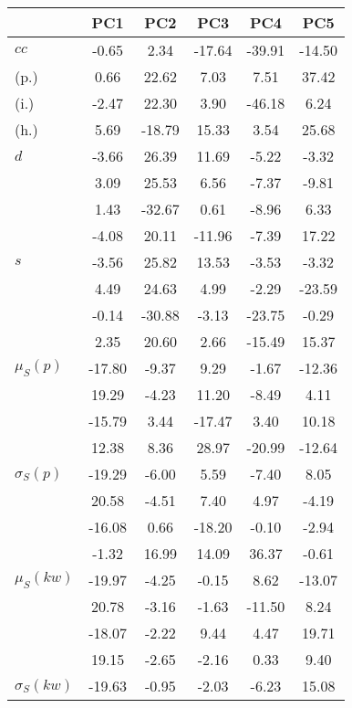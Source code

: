 \begin{table}[h!]
\begin{center}
\begin{tabular}{| l | c | c | c | c | c |}\hline
 & PC1 & PC2 & PC3 & PC4 & PC5 \\\hline
$cc$ & -0.65  & 2.34  & -17.64  & -39.91  & -14.50 \\\hline
(p.) & 0.66  & 22.62  & 7.03  & 7.51  & 37.42 \\\hline
(i.) & -2.47  & 22.30  & 3.90  & -46.18  & 6.24 \\\hline
(h.) & 5.69  & -18.79  & 15.33  & 3.54  & 25.68 \\\hline
$d$ & -3.66  & 26.39  & 11.69  & -5.22  & -3.32 \\\hline
 & 3.09  & 25.53  & 6.56  & -7.37  & -9.81 \\\hline
 & 1.43  & -32.67  & 0.61  & -8.96  & 6.33 \\\hline
 & -4.08  & 20.11  & -11.96  & -7.39  & 17.22 \\\hline
$s$ & -3.56  & 25.82  & 13.53  & -3.53  & -3.32 \\\hline
 & 4.49  & 24.63  & 4.99  & -2.29  & -23.59 \\\hline
 & -0.14  & -30.88  & -3.13  & -23.75  & -0.29 \\\hline
 & 2.35  & 20.60  & 2.66  & -15.49  & 15.37 \\\hline
$\mu_S(p)$ & -17.80  & -9.37  & 9.29  & -1.67  & -12.36 \\\hline
 & 19.29  & -4.23  & 11.20  & -8.49  & 4.11 \\\hline
 & -15.79  & 3.44  & -17.47  & 3.40  & 10.18 \\\hline
 & 12.38  & 8.36  & 28.97  & -20.99  & -12.64 \\\hline
$\sigma_S(p)$ & -19.29  & -6.00  & 5.59  & -7.40  & 8.05 \\\hline
 & 20.58  & -4.51  & 7.40  & 4.97  & -4.19 \\\hline
 & -16.08  & 0.66  & -18.20  & -0.10  & -2.94 \\\hline
 & -1.32  & 16.99  & 14.09  & 36.37  & -0.61 \\\hline
$\mu_S(kw)$ & -19.97  & -4.25  & -0.15  & 8.62  & -13.07 \\\hline
 & 20.78  & -3.16  & -1.63  & -11.50  & 8.24 \\\hline
 & -18.07  & -2.22  & 9.44  & 4.47  & 19.71 \\\hline
 & 19.15  & -2.65  & -2.16  & 0.33  & 9.40 \\\hline
$\sigma_S(kw)$ & -19.63  & -0.95  & -2.03  & -6.23  & 15.08 \\\hline

\end{tabular}
\end{center}
\end{table}
